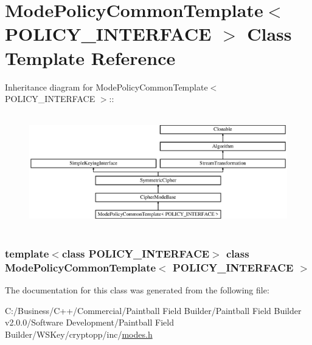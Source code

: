 \hypertarget{class_mode_policy_common_template}{
\section{ModePolicyCommonTemplate$<$ POLICY\_\-INTERFACE $>$ Class Template Reference}
\label{class_mode_policy_common_template}
}
Inheritance diagram for ModePolicyCommonTemplate$<$ POLICY\_\-INTERFACE $>$::\begin{figure}[H]
\begin{center}
\leavevmode
\includegraphics[height=5.07553cm]{class_mode_policy_common_template}
\end{center}
\end{figure}
\subsubsection*{template$<$class POLICY\_\-INTERFACE$>$ class ModePolicyCommonTemplate$<$ POLICY\_\-INTERFACE $>$}



The documentation for this class was generated from the following file:\begin{DoxyCompactItemize}
\item 
C:/Business/C++/Commercial/Paintball Field Builder/Paintball Field Builder v2.0.0/Software Development/Paintball Field Builder/WSKey/cryptopp/inc/\hyperlink{modes_8h}{modes.h}\end{DoxyCompactItemize}
